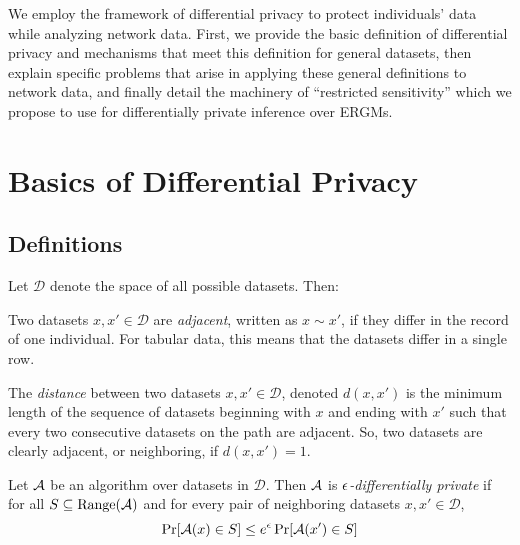 We employ the framework of differential privacy to protect individuals' data while analyzing network data.  First, we provide the basic definition of differential privacy and mechanisms that meet this definition for general datasets, then explain specific problems that arise in applying these general definitions to network data, and finally detail the machinery of ``restricted sensitivity'' which we propose to use for differentially private inference over ERGMs.

\section{Basics of Differential Privacy}

\subsection*{Definitions}

Let $\mathcal{D}$ denote the space of all possible datasets. Then:

\begin{definition}
\label{def:neighbors}
Two datasets $x, x' \in \mathcal{D}$ are \emph{adjacent}, written as $x \sim x'$, if 
they differ in the record of one individual. For tabular data, this means that the datasets differ in a single row. 
\end{definition}

\begin{definition}
	\label{def:distance}
	The \emph{distance} between two datasets $x, x' \in \mathcal{D}$, denoted $d(x, x')$ is the minimum length of the sequence of datasets beginning with $x$ and ending with $x'$ such that every two consecutive datasets on the path are adjacent. So, two datasets are clearly adjacent, or neighboring, if $d(x, x') = 1$. 
\end{definition}

\begin{definition} Let $\mathcal{A}$ be an algorithm over datasets in $\mathcal{D}$. Then $\mathcal{A}$ is \emph{$\epsilon$-differentially private} if for all $S \subseteq \text{Range}(\mathcal{A})$ and for every pair of neighboring datasets $x, x' \in \mathcal{D}$,
	\begin{equation*}
	\Pr[\mathcal{A}(x) \in S] \leq e^{\epsilon} \Pr[\mathcal{A}(x') \in S]
	\end{equation*}
\end{definition}

